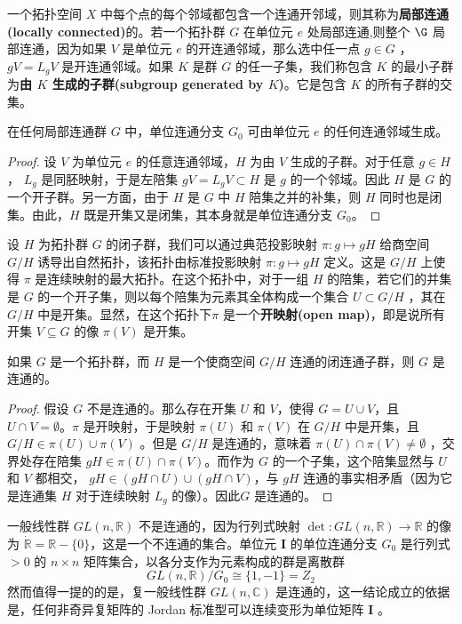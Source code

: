 一个拓扑空间 $X$ 中每个点的每个邻域都包含一个连通开邻域，则其称为\textbf{局部连通(locally connected)}的。若一个拓扑群 $G$ 在单位元 $e$ 处局部连通,则整个 $\G$ 局部连通，因为如果 $V$ 是单位元 $e$ 的开连通邻域，那么选中任一点 $g\in G$ ， $gV =L_{g} V$ 是开连通邻域。如果 $K$ 是群 $G$ 的任一子集，我们称包含 $K$ 的最小子群为\textbf{由 $K$ 生成的子群(subgroup generated by $ K$)}。它是包含 $K$ 的所有子群的交集。

\begin{theorm}\label{eg:10.21}
	在任何局部连通群 $G$ 中，单位连通分支 $G_{0}$ 可由单位元 $e$ 的任何连通邻域生成。
\end{theorm}

\begin{proof}
	设 $V$ 为单位元 $e$ 的任意连通邻域，$H$ 为由 $V$ 生成的子群。对于任意 $g\in H$， $L_{g}$ 是同胚映射，于是左陪集 $gV=L_{g} V\subset H$ 是 $g$ 的一个邻域。因此 $H$ 是 $G$ 的一个开子群。另一方面，由于 $H$ 是 $G$ 中 $H$ 陪集之并的补集，则 $H$ 同时也是闭集。由此，$H$ 既是开集又是闭集，其本身就是单位连通分支 $G_{0}$。
\end{proof}

	设 $H$ 为拓扑群 $G$ 的闭子群，我们可以通过典范投影映射 $\pi :g\mapsto gH$ 给商空间 $G/H$ 诱导出自然拓扑，该拓扑由标准投影映射 $\pi :g\mapsto gH$ 定义。这是 $G/H$ 上使得 $\pi $ 是连续映射的最大拓扑。在这个拓扑中，对于一组 $H$ 的陪集，若它们的并集是 $G$ 的一个开子集，则以每个陪集为元素其全体构成一个集合 $U\subset G/H$ ，其在 $G/H$ 中是开集。显然，在这个拓扑下$\pi $ 是一个\textbf{开映射(open map)}，即是说所有开集 $V\subseteq G$ 的像 $\pi (V)$ 是开集。

\begin{theorm}\label{eg:10.21}
	如果 $G$ 是一个拓扑群，而 $H$ 是一个使商空间 $G/H$ 连通的闭连通子群，则 $G$ 是连通的。
\end{theorm}

\begin{proof}
	假设 $G$ 不是连通的。那么存在开集 $U$ 和 $V$，使得 $G=U\cup V$，且 $U\cap V=\emptyset $。$\pi $ 是开映射，于是映射 $\pi (U)$ 和 $\pi (V)$ 在 $G/H$ 中是开集，且 $G/H\in \pi (U)\cup \pi (V)$ 。但是 $G/H$ 是连通的，意味着 $\pi (U)\cap \pi (V)\neq \emptyset $ ，交界处存在陪集 $gH\in \pi (U)\cap \pi (V)$。而作为 $G$ 的一个子集，这个陪集显然与 $ U$ 和 $ V$ 都相交， $gH\in (gH\cap U)\cup (gH\cap V)$，与 $gH$ 连通的事实相矛盾（因为它是连通集 $ H$ 对于连续映射 $L_{g}$ 的像）。因此$G$ 是连通的。
\end{proof}

\begin{eg}\label{eg:10.22}
	一般线性群 $GL(n,\mathbb{R} )$ 不是连通的，因为行列式映射 $\det :GL(n,\mathbb{R} )\rightarrow \mathbb{R}$ 的像为 $\dot{\mathbb{R}} =\mathbb{R} -\{0\}$，这是一个不连通的集合。单位元 $ \mathbf{I}$ 的单位连通分支 $G_{0}$ 是行列式 $  >0$ 的 $n\times n$ 矩阵集合，以各分支作为元素构成的群是离散群
\begin{equation*}
GL(n,\mathbb{R} )/G_{0} \cong \{1,-1\}=Z_{2}
\end{equation*}
然而值得一提的的是，复一般线性群 $GL(n,\mathbb{C} )$ 是连通的，这一结论成立的依据是，任何非奇异复矩阵的 Jordan 标准型可以连续变形为单位矩阵 $ \mathbf{I}$ 。
\end{eg}

